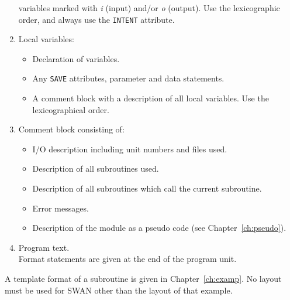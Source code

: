 \documentclass[12pt]{book}
\begin{document}
\begin{enumerate}
        variables marked with \textit{i} (input) and/or \textit{o} (output).
        Use the lexicographic order, and always use the {\tt INTENT} attribute.
  \item Local variables:
        \begin{itemize}
            \item Declaration of variables.
            \item Any {\tt SAVE} attributes, parameter and data statements.
            \item A comment block with a description of all local variables. Use the lexicographical order.
        \end{itemize}
  \item Comment block consisting of:
        \begin{itemize}
          \item I/O description including unit numbers and files used.
          \item Description of all subroutines used.
          \item Description of all subroutines which call the current subroutine.
          \item Error messages.
          \item Description of the module as a pseudo code (see Chapter~\ref{ch:pseudo}).
        \end{itemize}
  \item Program text.\\
        Format statements are given at the end of the program unit.
\end{enumerate}
A template format of a subroutine is given in Chapter~\ref{ch:examp}. No layout must be used for SWAN other than the layout
of that example.

 \label{ch:io}
\end{document}
